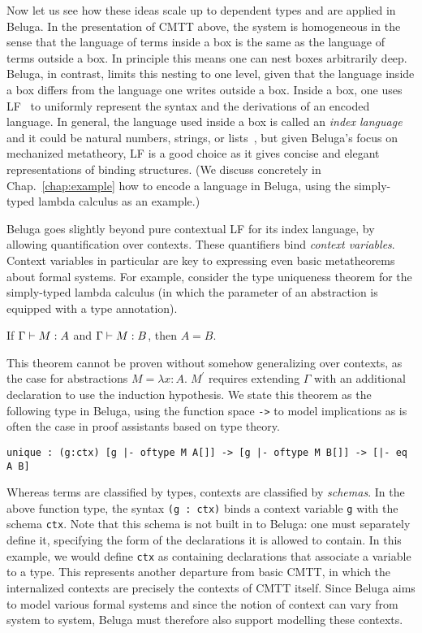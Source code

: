 Now let us see how these ideas scale up to dependent types and are applied in
Beluga.
In the presentation of CMTT above, the system is homogeneous in the sense that the
language of terms inside a box is the same as the language of terms outside a
box. In principle this means one can nest boxes arbitrarily deep.
Beluga, in contrast, limits this nesting to one level, given that the language
inside a box differs from the language one writes outside a box.
Inside a box, one uses LF~\cite{Harper93jacm} to uniformly represent the syntax
and the derivations of an encoded language.
In general, the language used inside a box is called an \emph{index language}
and it could be natural numbers, strings, or lists~\cite{ChH03Pha, Xi:POPL03},
but given Beluga's focus on mechanized metatheory, LF is a good choice as it
gives concise and elegant representations of binding structures.
(We discuss concretely in Chap.~\ref{chap:example} how to encode a language in
Beluga, using the simply-typed lambda calculus as an example.)

Beluga goes slightly beyond pure contextual LF for its index language, by
allowing quantification over contexts.
These quantifiers bind \emph{context variables}.
Context variables in particular are key to expressing even basic
metatheorems about formal systems.
For example, consider the type uniqueness theorem for the simply-typed lambda
calculus (in which the parameter of an abstraction is equipped with a type
annotation).
\begin{center}
  If $\Gamma \vdash M : A$ and $\Gamma \vdash M : B$, then $A = B$.%
\end{center}
This theorem cannot be proven without somehow generalizing over contexts, as the
case for abstractions $M = \lambda x{:}A.\; M^\prime$ requires extending
$\Gamma$ with an additional declaration to use the induction hypothesis.
We state this theorem as the following type in Beluga, using the function
space \lstinline!->! to model implications as is often the case in proof
assistants based on type theory.
\begin{lstlisting}[gobble=2]
  unique : (g:ctx) [g |- oftype M A[]] -> [g |- oftype M B[]] -> [|- eq A B]
\end{lstlisting}
Whereas terms are classified by types, contexts are classified by
\emph{schemas}.
In the above function type, the syntax \lstinline!(g : ctx)! binds a context
variable \lstinline!g! with the schema \lstinline!ctx!.
Note that this schema is not built in to Beluga: one must separately define it,
specifying the form of the declarations it is allowed to contain.
In this example, we would define \lstinline!ctx! as containing declarations that
associate a variable to a type.
This represents another departure from basic CMTT, in which the internalized
contexts are precisely the contexts of CMTT itself.
Since Beluga aims to model various formal systems and since the notion of
context can vary from system to system, Beluga must therefore also support
modelling these contexts.

